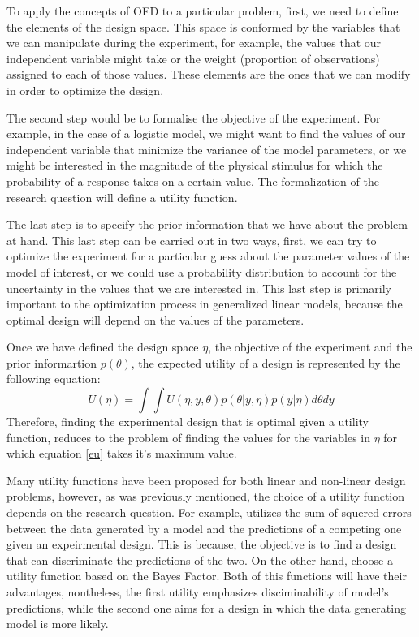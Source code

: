 \documentclass[preprint,review,12pt]{elsarticle}
\begin{document}
To apply the concepts of OED to a particular problem, first, we need to define the elements of the design space. This space is conformed by the variables that we can manipulate during the experiment, for example, the values that our independent variable might take or the weight (proportion of observations) assigned to each of those values. These elements are the ones that we can modify in order to optimize the design.

The second step would be to formalise the objective of the experiment. For example, in the case of a logistic model, we might want to find the values of our independent variable that minimize the variance of the model parameters, or we might be interested in the magnitude of the physical stimulus for which the probability of a response takes on a certain value. The formalization of the research question will define a utility function.

The last step is to specify the prior information that we have about the problem at hand. This last step can be carried out in two ways, first, we can try to optimize the experiment for a particular guess about the parameter values of the model of interest, or we could use a probability distribution to account for the uncertainty in the values that we are interested in. This last step is primarily important to the optimization process in generalized linear models, because the optimal design will depend on the values of the parameters.


Once we have defined the design space $\eta$, the objective of the experiment and the prior informartion $p(\theta)$, the expected utility of a design is represented by the following equation:
\begin{equation}
U(\eta)=\int \int U(\eta,y,\theta)p(\theta|y,\eta)p(y|\eta) d\theta dy
\label{eu}
\end{equation}
Therefore, finding the experimental design that is optimal given a utility function, reduces to the problem of finding the values for the variables in $\eta$ for which equation \ref{eu} takes it's maximum value.

Many utility functions have been proposed for both linear and non-linear design problems, however, as was previously mentioned, the choice of a utility function depends on the research question. For example, \cite{Myung2009} utilizes the sum of squered errors between the data generated by a model and the predictions of a competing one given an expeirmental design. This is because, the objective is to find a design that can discriminate the predictions of the two. On the other hand, \cite{ZL2010} choose a utility function based on the Bayes Factor. Both of this functions will have their advantages, nontheless, the first utility emphasizes disciminability of model's predictions, while the second one aims for a design in which the data generating model is more likely.
\end{document}
